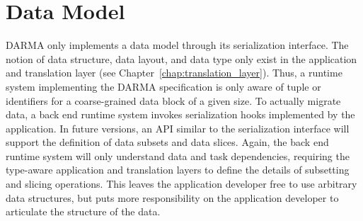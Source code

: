 
\section{Data Model}
\label{sec:data_model}
\gls{DARMA} only implements a \gls{data model} through its \gls{serialization} interface.
The notion of data structure, data layout, and data type only exist in the
application and \gls{translation layer} (see Chapter~\ref{chap:translation_layer}).
Thus, a \gls{runtime system} implementing the \gls{DARMA} specification is only
aware of \gls{tuple} or  identifiers for a coarse-grained data block of a given size.
To actually migrate data, a \gls{back end} \gls{runtime system} invokes
\gls{serialization} hooks implemented by the application.
In future versions, an \gls{API} similar to the \gls{serialization} interface will support the definition of data subsets and data slices.
Again, the \gls{back end} \gls{runtime system} will only understand data and
\gls{task} dependencies, requiring the type-aware application and \glspl{translation layer} to define
  the details of subsetting and slicing operations.
This leaves the application developer free to use arbitrary data structures,
     but puts more responsibility on the application developer to articulate
     the structure of the data.


